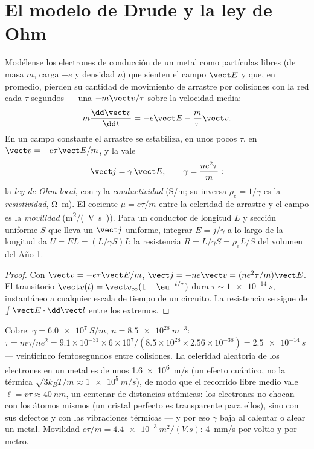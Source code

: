 \section{El modelo de Drude y la ley de Ohm}

\begin{proposition}\label{prop:b2:charges-currents-conduction:drude}
Modélense los electrones de conducción de un metal como partículas libres
(de masa $m$, carga $-e$ y densidad $n$) que sienten el campo $\vect E$ y
que, en promedio, pierden su cantidad de movimiento de arrastre por
colisiones con la red cada $\tau$ segundos --- una  $-m\vect v/\tau$ sobre la velocidad media:
\[
m\frac{\dd\vect v}{\dd t} = -e\vect E - \frac m\tau\vect v .
\]
En un campo constante el arrastre se estabiliza, en unos pocos $\tau$, en $\vect v = -e\tau
\vect E/m$, y la  vale
\[
\vect j = \gamma\,\vect E , \qquad \gamma = \frac{ne^2\tau}{m} :
\]
la \emph{ley de Ohm local}, con $\gamma$ la \emph{conductividad}
(\unit{S/m}; su inversa $\rho_e = 1/\gamma$ es la \emph{resistividad},
\unit{\ohm.m}). El cociente $\mu = e\tau/m$ entre la celeridad de arrastre y el campo es
la \emph{movilidad} (\unit{m^2/(V.s)}). Para un conductor de longitud $L$ y
sección uniforme $S$ que lleva un $\vect j$ uniforme, integrar $E = j/\gamma$
a lo largo de la longitud da $U = EL = (L/\gamma S)I$: la resistencia $R = L/\gamma S
= \rho_eL/S$ del volumen del Año 1.
\end{proposition}

\begin{proof}
Con $\vect v = -e\tau\vect E/m$, $\vect j = -ne\vect v = (ne^2\tau/m)\vect E$. El
transitorio $\vect v(t) = \vect v_\infty(1 - \eu^{-t/\tau})$ dura $\tau \sim
\qty{1e-14}{s}$, instantáneo a cualquier escala de tiempo de un circuito.
La resistencia se sigue de $\int\vect E\cdot\dd\vect l$ entre los extremos.
\end{proof}

\begin{example}\label{ex:b2:charges-currents-conduction:copper}
Cobre: $\gamma = \qty{6.0e7}{S/m}$, $n = \qty{8.5e28}{m^{-3}}$: $\tau = m\gamma/ne^2 =
9.1 \times 10^{-31} \times 6 \times 10^7/(8.5 \times 10^{28} \times 2.56 \times 10^{-38}) = \qty{2.5e-14}{s}$
--- veinticinco femtosegundos entre colisiones. La celeridad aleatoria de
los electrones en un metal es de unos \qty{1.6e6}{m/s} (un efecto cuántico,
no la térmica $\sqrt{3k_BT/m} \approx \qty{1e5}{m/s}$), de modo que el recorrido libre medio vale $\ell
= v\tau \approx \qty{40}{nm}$, un centenar de distancias atómicas: los electrones no
chocan con los átomos mismos (un cristal perfecto es transparente para
ellos), sino con sus defectos y con las vibraciones térmicas --- y por eso
$\gamma$ baja al calentar o alear un metal. Movilidad $e\tau/m =
\qty{4.4e-3}{m^2/(V.s)}$: \qty{4}{mm/s} por voltio y por metro.
\end{example}

